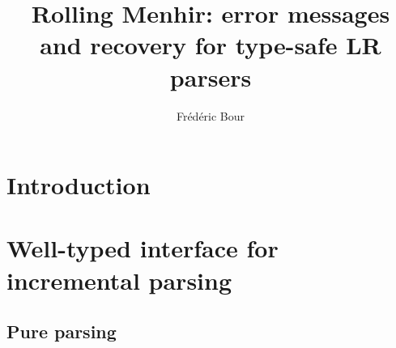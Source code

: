 \documentclass[twoside,a4paper]{article}
\title{Rolling Menhir: error messages and recovery for type-safe LR parsers}
\author{Frédéric Bour}%
\begin{document}
\setcounter{page}{1}
\maketitle

\section{Introduction}


\section{Well-typed interface for incremental parsing}




\subsection{Pure parsing}
\end{document}
